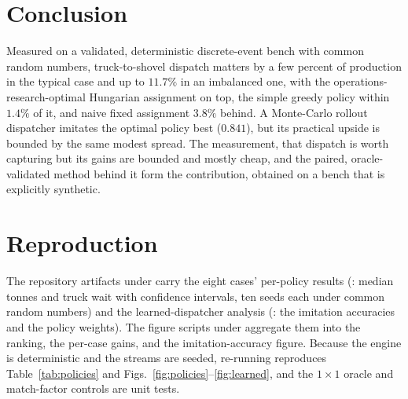 \documentclass[journal]{IEEEtran}
\begin{document}
\section{Conclusion}

Measured on a validated, deterministic discrete-event bench with common random numbers, truck-to-shovel dispatch
matters by a few percent of production in the typical case and up to $11.7\%$ in an imbalanced one, with the
operations-research-optimal Hungarian assignment on top, the simple greedy policy within $1.4\%$ of it, and naive
fixed assignment $3.8\%$ behind. A Monte-Carlo rollout dispatcher imitates the optimal policy best ($0.841$),
but its practical upside is bounded by the same modest spread. The measurement, that dispatch is worth
capturing but its gains are bounded and mostly cheap, and the paired, oracle-validated method behind it form the
contribution, obtained on a bench that is explicitly synthetic.

\appendices
\section{Reproduction}\label{app:repro}

The repository artifacts under  carry the eight cases' per-policy results
(: median tonnes and truck wait with confidence intervals, ten seeds each under common
random numbers) and the learned-dispatcher analysis (: the imitation accuracies and the
policy weights). The figure scripts under  aggregate them into the
ranking, the per-case gains, and the imitation-accuracy figure. Because the engine is deterministic and the
streams are seeded, re-running reproduces Table~\ref{tab:policies} and
Figs.~\ref{fig:policies}--\ref{fig:learned}, and the $1\times1$ oracle and match-factor controls are unit tests.

\balance
\end{document}
